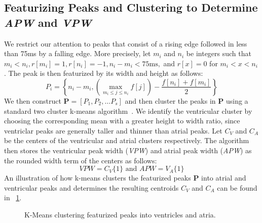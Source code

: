 \documentclass[conference]{IEEEtran}
\newcommand{\APW}{\textit{APW}}
\newcommand{\VPW}{\textit{VPW}}
\begin{document}
\subsection{Featurizing Peaks and Clustering to Determine \APW{} and \VPW}
We restrict our attention to peaks that consist of a rising edge
followed in less than 75ms by a falling edge. 
More precisely, let $m_i$ and $n_i$ be integers such that $m_i < n_i, r[m_i]=1, r[n_i] = -1, n_i-m_i < 75 \text{ms},$ and $r[x]=0 $ for $m_i < x < n_i$.
The peak is then featurized by its width and
height as follows:
\begin{equation*}
	P_i = \left\{n_i-m_i, \left( \max\limits_{m_i\le j\le n_i} f[j] \right) - \frac{f[n_i]+f[m_i]}{2} \right\}
\end{equation*}
 We then construct $\mathbf{P} = [P_1, P_2, \dots P_s]$ and then
cluster the peaks in $\mathbf{P}$ using a standard two cluster k-means
algorithm~\cite{k-means}. 
We identify the ventricular cluster by choosing the corresponding mean 
with a greater height to width ratio, since
ventriclar peaks are generally taller and thinner than atrial peaks. Let $C_V$ and $C_A$
be the centers of the ventricular and atrial clusters %
respectively. The algorithm then stores the ventricular
peak width (\VPW) and atrial peak width (\APW) as the
rounded width term of the centers as follows:
\begin{equation*}
	VPW=C_V\{1\} \text{ and } APW=V_A\{1\}
\end{equation*}
An illustration of how k-means clusters the
featurized peaks $\mathbf{P}$ into atrial and ventricular peaks and
determines the resulting centroids $C_V$ and $C_A$ can be
found in  \figurename~\ref{fig:kmeans}.


\begin{figure}
	\centering
	\caption{
	K-Means clustering featurized peaks into ventricles and atria.}
		\label{fig:kmeans}
\end{figure}
\end{document}
